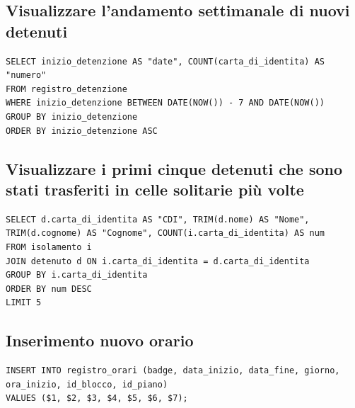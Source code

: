 \documentclass[a4paper,12pt]{report}
\begin{document}
\subsection{Visualizzare l'andamento settimanale di nuovi detenuti}
\begin{verbatim}
SELECT inizio_detenzione AS "date", COUNT(carta_di_identita) AS "numero"
FROM registro_detenzione
WHERE inizio_detenzione BETWEEN DATE(NOW()) - 7 AND DATE(NOW())
GROUP BY inizio_detenzione
ORDER BY inizio_detenzione ASC
\end{verbatim}
\subsection{Visualizzare i primi cinque detenuti che sono stati trasferiti in celle solitarie più volte}
\begin{verbatim}
SELECT d.carta_di_identita AS "CDI", TRIM(d.nome) AS "Nome", TRIM(d.cognome) AS "Cognome", COUNT(i.carta_di_identita) AS num
FROM isolamento i
JOIN detenuto d ON i.carta_di_identita = d.carta_di_identita
GROUP BY i.carta_di_identita
ORDER BY num DESC
LIMIT 5
\end{verbatim}
\subsection{Inserimento nuovo orario}
\begin{verbatim}
INSERT INTO registro_orari (badge, data_inizio, data_fine, giorno, ora_inizio, id_blocco, id_piano)
VALUES ($1, $2, $3, $4, $5, $6, $7);
\end{verbatim}
\end{document}
